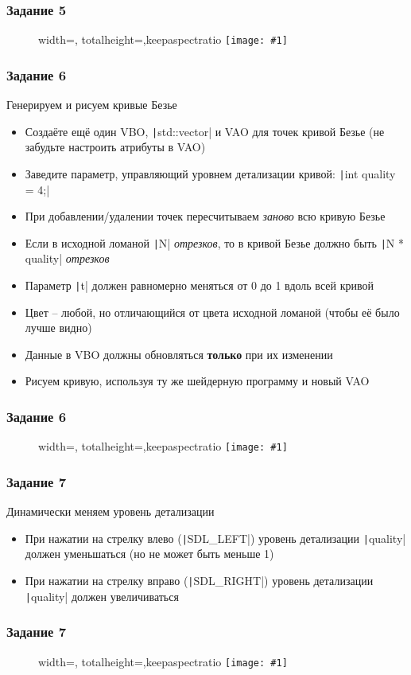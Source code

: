 \documentclass[10pt]{beamer}
\newcommand{\slideimage}[1]{
  \begin{figure}
    \begin{adjustbox}{width=\textwidth, totalheight=\textheight-2\baselineskip-2\baselineskip,keepaspectratio}
      \texttt{[image: \#1]}
    \end{adjustbox}
  \end{figure}
}
\begin{document}
\begin{frame}
\frametitle{Задание 5}
\slideimage{5.png}
\end{frame}

\begin{frame}[fragile]
\frametitle{Задание 6}
Генерируем и рисуем кривые Безье
\begin{itemize}
\item Создаёте ещё один VBO, \texttt|std::vector| и VAO для точек кривой Безье (не забудьте настроить атрибуты в VAO)
\item Заведите параметр, управляющий уровнем детализации кривой: \texttt|int quality = 4;|
\item При добавлении/удалении точек пересчитываем \textit{заново} всю кривую Безье
\item Если в исходной ломаной \texttt|N| \textit{отрезков}, то в кривой Безье должно быть \texttt|N * quality| \textit{отрезков}
\item Параметр \texttt|t| должен равномерно меняться от 0 до 1 вдоль всей кривой
\item Цвет -- любой, но отличающийся от цвета исходной ломаной (чтобы её было лучше видно)
\item Данные в VBO должны обновляться \textbf{\alert{только}} при их изменении
\item Рисуем кривую, используя ту же шейдерную программу и новый VAO
\end{itemize}
\end{frame}

\begin{frame}
\frametitle{Задание 6}
\slideimage{6.png}
\end{frame}

\begin{frame}[fragile]
\frametitle{Задание 7}
Динамически меняем уровень детализации
\begin{itemize}
\item При нажатии на стрелку влево (\texttt|SDL_LEFT|) уровень детализации \texttt|quality| должен уменьшаться (но не может быть меньше 1)
\item При нажатии на стрелку вправо (\texttt|SDL_RIGHT|) уровень детализации \texttt|quality| должен увеличиваться
\end{itemize}
\end{frame}

\begin{frame}
\frametitle{Задание 7}
\slideimage{7.png}
\end{frame}
\end{document}
